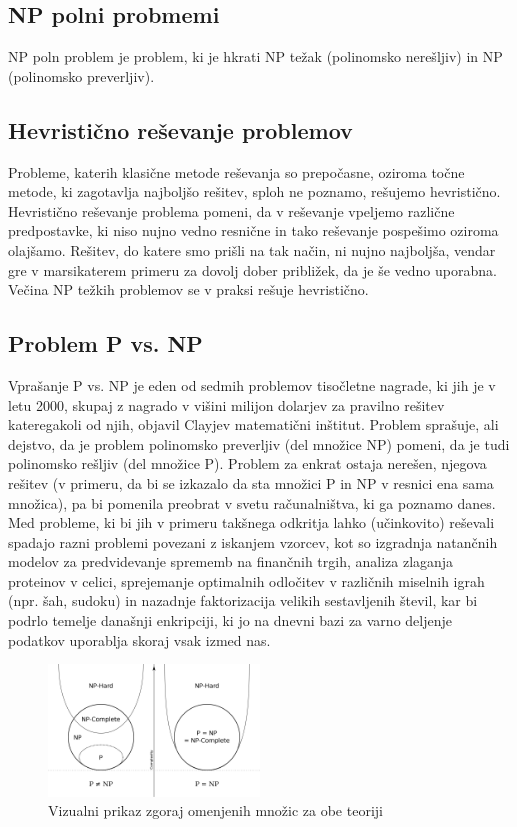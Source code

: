 \documentclass[11pt]{article}
\begin{document}
\subsection{NP polni probmemi}

NP poln problem je problem, ki je hkrati NP težak (polinomsko nerešljiv) in NP (polinomsko preverljiv). \cite{npc}

\subsection{Hevristično reševanje problemov}

Probleme, katerih klasične metode reševanja so prepočasne, oziroma točne metode, ki zagotavlja najboljšo rešitev, sploh ne poznamo, rešujemo hevristično. Hevristično reševanje problema pomeni, da v reševanje vpeljemo različne predpostavke, ki niso nujno vedno resnične in tako reševanje pospešimo oziroma olajšamo. Rešitev, do katere smo prišli na tak način, ni nujno najboljša, vendar gre v marsikaterem primeru za dovolj dober približek, da je še vedno uporabna. Večina NP težkih problemov se v praksi rešuje hevristično. \cite{hevristika}

\subsection{Problem P vs. NP}

Vprašanje P vs. NP je eden od sedmih problemov tisočletne nagrade, ki jih je v letu 2000, skupaj z nagrado v višini milijon dolarjev za pravilno rešitev kateregakoli od njih, objavil Clayjev matematični inštitut. Problem sprašuje, ali dejstvo, da je problem polinomsko preverljiv (del množice NP) pomeni, da je tudi polinomsko rešljiv (del množice P). Problem za enkrat ostaja nerešen, njegova rešitev (v primeru, da bi se izkazalo da sta množici P in NP v resnici ena sama množica), pa bi pomenila preobrat v svetu računalništva, ki ga poznamo danes. Med probleme, ki bi jih v primeru takšnega odkritja lahko (učinkovito) reševali spadajo razni problemi povezani z iskanjem vzorcev, kot so izgradnja natančnih modelov za predvidevanje sprememb na finančnih trgih, analiza zlaganja proteinov v celici, sprejemanje optimalnih odločitev v različnih miselnih igrah (npr. šah, sudoku) in nazadnje faktorizacija velikih sestavljenih števil, kar bi podrlo temelje današnji enkripciji, ki jo na dnevni bazi za varno deljenje podatkov uporablja skoraj vsak izmed nas. \cite{pvnp, pvnpVideo, pvnpVpliv}

\begin{figure}[H]
    \centering
    \includegraphics[width=0.5\textwidth]{P_vs_NP.png}
    \caption{Vizualni prikaz zgoraj omenjenih množic za obe teoriji \cite{pvnp}}
    \label{fig:mesh1}
\end{figure}
\end{document}
